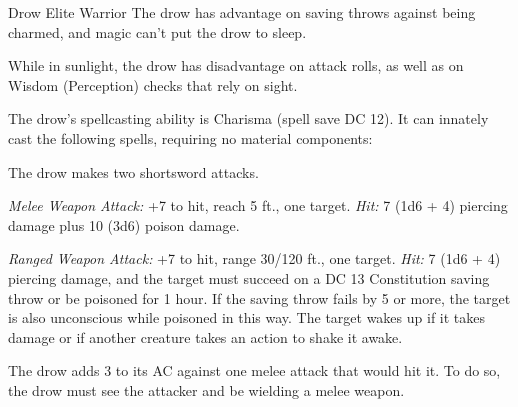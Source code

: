 \documentclass[10pt,a4paper,twoside,twocolumn,openany,nodeprecatedcode]{dndbook}
\begin{document}
\begin{DndMonster}[float=ht]{Drow Elite Warrior}
\DndMonsterBasics[
armor-class = {18 (studded leather armor)},
hit-points = {\DndDice{11d8 + 22}},
speed = {30 ft.}
]
\DndMonsterAbilityScores[
 str = 13,
 dex = 18,
 con = 14,
 int = 11,
 wis = 13,
 cha = 12
]
\DndMonsterDetails[
saving-throws = {Dex +7, Con +5, Wis +4},
skills = {Perception +4, Stealth +10},
senses = {darkvision 120 ft., passive perception 14},
languages = {Elvish, Undercommon},
challenge = 5,
]
The drow has advantage on saving throws against being charmed, and magic can't put the drow to sleep.

While in sunlight, the drow has disadvantage on attack rolls, as well as on Wisdom (Perception) checks that rely on sight.

The drow's spellcasting ability is Charisma (spell save DC 12). It can innately cast the following spells, requiring no material components:
\begin{DndMonsterSpells}
\end{DndMonsterSpells}
\par
{}
The drow makes two shortsword attacks.

\textsl{Melee Weapon Attack:} +7 to hit, reach 5 ft., one target. \textsl{Hit:} 7 (1d6 + 4) piercing damage plus 10 (3d6) poison damage.

\textsl{Ranged Weapon Attack:} +7 to hit, range 30/120 ft., one target. \textsl{Hit:} 7 (1d6 + 4) piercing damage, and the target must succeed on a DC 13 Constitution saving throw or be poisoned for 1 hour. If the saving throw fails by 5 or more, the target is also unconscious while poisoned in this way. The target wakes up if it takes damage or if another creature takes an action to shake it awake.

\par
{}
The drow adds 3 to its AC against one melee attack that would hit it. To do so, the drow must see the attacker and be wielding a melee weapon.

\end{DndMonster}


\clearpage
{}
\end{document}
